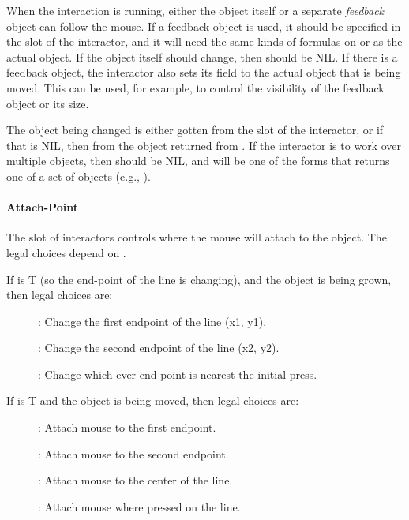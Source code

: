 When the interaction is running, either the object itself or a separate
{\it feedback} object can follow the mouse.  If a feedback object is used, it
should be specified in the  slot of the interactor, and
it will need the same kinds of formulas on  or  as the
actual object.  If
the object itself should change, then  should be NIL.
If there is a feedback object, the interactor also sets its
 field to the actual object that is being moved.
This can be used, for example,
to control the visibility of the feedback object or its size.

The object being changed is
either gotten from the  slot of the interactor, or if
that is NIL, then from the object returned from .
If the interactor is to work over
multiple objects, then  should be NIL, and 
will be one of the forms that returns one of a set of objects (e.g.,
).

\paragraph{Attach-Point}
\label{attachpoint}
The  slot of interactors controls where the mouse will
attach to the object.  The legal choices
depend on .

If  is T (so the end-point of the line
is changing), and the object is being grown, then legal choices are:
\begin{description}
\item[] : Change the first endpoint of the line (x1, y1).

\item[] : Change the second endpoint of the line (x2, y2).

\item[] : Change which-ever end point is nearest the
initial press.
\end{description}

If  is T and the object is being moved, then legal choices are:
\begin{description}
\item[] : Attach mouse to the first endpoint.

\item[] : Attach mouse to the second endpoint.

\item[] : Attach mouse to the center of the line.

\item[] : Attach mouse where pressed on the line.
\end{description}

